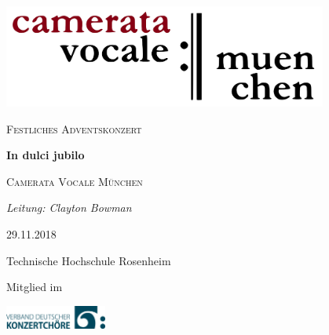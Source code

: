 \documentclass[11pt, ngermanm, titlepage]{article}
\begin{document}
	\begin{titlepage}
	\centering
	\includegraphics[width=0.8\textwidth]{img/cvlogo.png}\par\vspace{2cm}
	
	{\scshape\Large Festliches Adventskonzert\par}
	\vspace{1.5cm}
	{\fontsize{50}{60}\bfseries\jubilo In dulci jubilo\par}
	\vspace{1.5cm}
	{\scshape\LARGE Camerata Vocale München\par}
	\vspace{1cm}
	{\Large\itshape Leitung: Clayton Bowman\par}
	\vfill
	29.11.2018\par
	Technische Hochschule Rosenheim
	
	\vfill
	
	{\scriptsize Mitglied im\par}
	\includegraphics[width=0.25\textwidth]{img/vdkc_logo_klein.jpg}\par\vspace{2cm}


	\end{titlepage}

	\pagebreak

	
\end{document}
